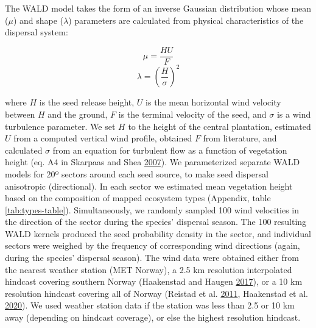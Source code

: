 \documentclass[
]{article}
\begin{document}
The WALD model takes the form of an inverse Gaussian distribution whose mean (\(\mu\)) and shape (\(\lambda\)) parameters are calculated from physical characteristics of the dispersal system:

\begin{equation}
\mu  = \frac{HU}{F}
\end{equation}
\begin{equation}
\lambda = \left(\frac{H}{\sigma}\right)^2
\end{equation}

where \(H\) is the seed release height, \(U\) is the mean horizontal wind velocity between \(H\) and the ground, \(F\) is the terminal velocity of the seed, and \(\sigma\) is a wind turbulence parameter.
We set \(H\) to the height of the central plantation, estimated \(U\) from a computed vertical wind profile, obtained \(F\) from literature, and calculated \(\sigma\) from an equation for turbulent flow as a function of vegetation height (eq. A4 in Skarpaas and Shea \protect\hyperlink{ref-skarpaasDispersalPatternsDispersal2007}{2007}).
We parameterized separate WALD models for 20º sectors around each seed source, to make seed dispersal anisotropic (directional).
In each sector we estimated mean vegetation height based on the composition of mapped ecosystem types (Appendix, table \ref{tab:types-table}).
Simultaneously, we randomly sampled 100 wind velocities in the direction of the sector during the species' dispersal season.
The 100 resulting WALD kernels produced the seed probability density in the sector, and individual sectors were weighed by the frequency of corresponding wind directions (again, during the species' dispersal season).
The wind data were obtained either from the nearest weather station (MET Norway), a 2.5 km resolution interpolated hindcast covering southern Norway (Haakenstad and Haugen \protect\hyperlink{ref-haakenstad15yearHighResolution2017}{2017}), or a 10 km resolution hindcast covering all of Norway (Reistad et al. \protect\hyperlink{ref-reistadHighresolutionHindcastWind2011}{2011}, Haakenstad et al. \protect\hyperlink{ref-haakenstadNORA10EIRevisedRegional2020}{2020}). We used weather station data if the station was less than 2.5 or 10 km away (depending on hindcast coverage), or else the highest resolution hindcast.
\end{document}
